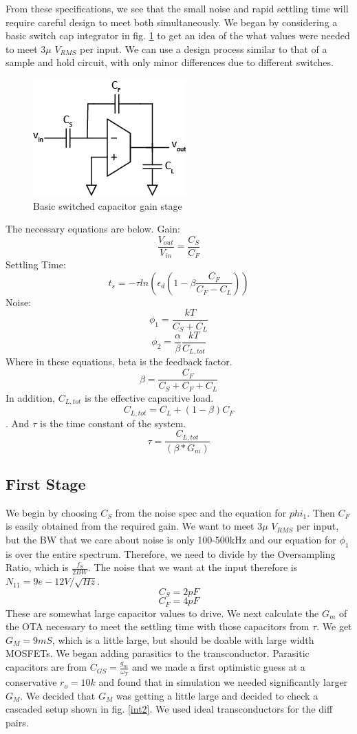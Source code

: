 \documentclass[conference]{IEEEtran}
\begin{document}
From these specifications, we see that the small noise and rapid settling time will require careful design to meet both simultaneously. We began by considering a basic switch cap integrator in fig. \ref{int1} to get an idea of the what values were needed to meet $3\mu$ $V_{RMS}$ per input. We can use a design process similar to that of a sample and hold circuit, with only minor differences due to different switches.

\begin{figure}[h]
\centering
\includegraphics[width=0.4\linewidth]{illustrator/integrator1}
\caption{Basic switched capacitor gain stage}
\label{int1}
\end{figure}

The necessary equations are below. \newline
Gain:
$$\frac{V_{out}}{V_{in}}=\frac{C_S}{C_F}$$
Settling Time:
$$t_s = -\tau ln \left(\epsilon_d \left(1-\beta \frac{C_F}{C_F-C_L}\right)\right)$$
Noise:
$$\phi_1 = \frac{kT}{C_S + C_L}$$
$$\phi_2 = \frac{\alpha}{\beta}\frac{kT}{C_{L,tot}}$$
Where in these equations, beta is the feedback factor. $$\beta = \frac{C_F}{C_S + C_F + C_L}$$ 
In addition, $C_{L,tot}$ is the effective capacitive load.$$C_{L,tot}=C_L+(1-\beta)C_F$$.
And $\tau$ is the time constant of the system. $$\tau = \frac{C_{L,tot}}{(\beta*G_m)}$$

\subsection{First Stage}

We begin by choosing $C_S$ from the noise spec and the equation for $phi_1$. Then $C_F$ is easily obtained from the required gain. We want to meet $3\mu$ $V_{RMS}$ per input, but the BW that we care about noise is only 100-500kHz and our equation for $\phi_1$ is over the entire spectrum. Therefore, we need to divide by the Oversampling Ratio, which is $\frac{f_S}{2BW}$. The noise that we want at the input therefore is $N_{11}=9e-12 V/\sqrt{Hz}$.
$$C_S = 2pF$$ 
$$C_F = 4pF$$
These are somewhat large capacitor values to drive. We next calculate the $G_m$ of the OTA necessary to meet the settling time with those capacitors from $\tau$. We get $G_M = 9mS$, which is a little large, but should be doable with large width MOSFETs.
We began adding parasitics to the transconductor. Parasitic capacitors are from $C_{GS}=\frac{g_m}{\omega_T}$ and we made a first optimistic guess at a conservative $r_o=10k$ and found that in simulation we needed significantly larger $G_M$.
We decided that $G_M$ was getting a little large and decided to check a cascaded setup shown in fig. \ref{int2}. We used ideal transconductors for the diff pairs.
\end{document}
